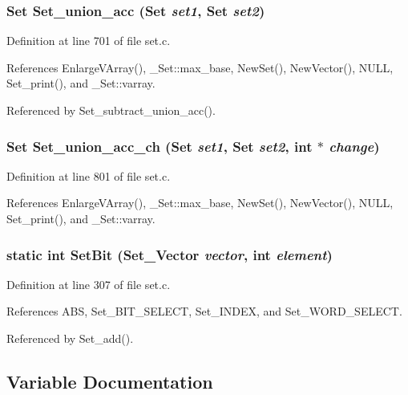 \subsubsection{\setlength{\rightskip}{0pt plus 5cm}\bf{Set} Set\_\-union\_\-acc (\bf{Set} {\em set1}, \bf{Set} {\em set2})}\label{set_8c_9fa6e14a788fb67c75d8e66e2808ea25}




Definition at line 701 of file set.c.

References Enlarge\-VArray(), \_\-Set::max\_\-base, New\-Set(), New\-Vector(), NULL, Set\_\-print(), and \_\-Set::varray.

Referenced by Set\_\-subtract\_\-union\_\-acc().
\subsubsection{\setlength{\rightskip}{0pt plus 5cm}\bf{Set} Set\_\-union\_\-acc\_\-ch (\bf{Set} {\em set1}, \bf{Set} {\em set2}, int $\ast$ {\em change})}\label{set_8c_630ce90c9d12b610a191efc27527861a}




Definition at line 801 of file set.c.

References Enlarge\-VArray(), \_\-Set::max\_\-base, New\-Set(), New\-Vector(), NULL, Set\_\-print(), and \_\-Set::varray.
\subsubsection{\setlength{\rightskip}{0pt plus 5cm}static int Set\-Bit (\bf{Set\_\-Vector} {\em vector}, int {\em element})\hspace{0.3cm}{\tt  [static]}}\label{set_8c_b92fcc2d593ddf816639a8aa3d8c9a60}




Definition at line 307 of file set.c.

References ABS, Set\_\-BIT\_\-SELECT, Set\_\-INDEX, and Set\_\-WORD\_\-SELECT.

Referenced by Set\_\-add().

\subsection{Variable Documentation}

